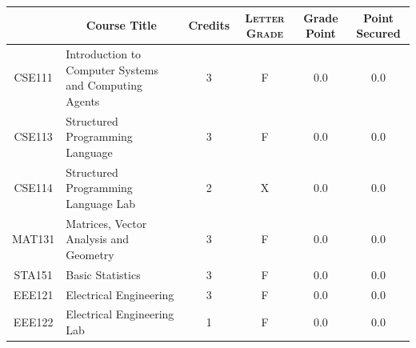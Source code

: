 \documentclass[11pt]{article}
\newcommand*{\numtwo}[1]{\pgfmathprintnumber[
                    fixed, precision=2, fixed zerofill=true]{#1}}
\begin{document}
                \begin{center}
                    \renewcommand{\arraystretch}{1.08}
                    
                \begin{tabular}{|c|l|c|>{\scshape}c|c|c|}
                \hline  \rule[-1ex]{0pt}{3.5ex} {\centering{\bf Course Code}} &  \multicolumn{1}{c|}{\textbf{Course Title}}  & {\bf Credits} & {\bf Letter Grade} & {\bf Grade Point} & {\bf Point Secured}  \\ 
                \hline   CSE111 &  Introduction to Computer Systems and Computing Agents		 & 3 & F & 0.0 & 0.0 \\ %
                \hline   CSE113 &  Structured Programming Language		 & 3 & F & 0.0 & 0.0 \\ %
                \hline   CSE114 &  Structured Programming Language Lab		 & 2 & X & 0.0 & 0.0 \\ %
                \hline   MAT131 &  Matrices, Vector Analysis and Geometry		 & 3 & F & 0.0 & 0.0 \\ %
                \hline   STA151 &  Basic Statistics		 & 3 & F & 0.0 & 0.0 \\ %
                \hline   EEE121 &  Electrical Engineering		 & 3 & F & 0.0 & 0.0 \\ %
                \hline   EEE122 &  Electrical Engineering Lab		 & 1 & F & 0.0 & 0.0 \\ %

\hline                %
                \end{tabular}
                \end{center}
                \renewcommand{\arraystretch}{1.03}
\end{document}

